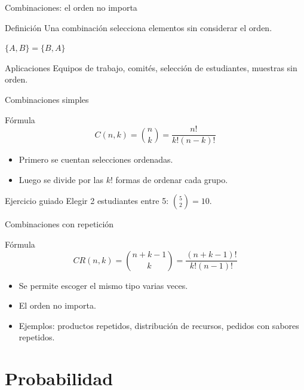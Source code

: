 \documentclass[aspectratio=169,11pt]{beamer}
\begin{document}
\begin{frame}{Combinaciones: el orden no importa}
\begin{block}{Definición}
Una combinación selecciona elementos sin considerar el orden.
\end{block}
\begin{center}
$\{A,B\}=\{B,A\}$
\end{center}
\begin{exampleblock}{Aplicaciones}
Equipos de trabajo, comités, selección de estudiantes, muestras sin orden.
\end{exampleblock}
\end{frame}

\begin{frame}{Combinaciones simples}
\begin{block}{Fórmula}
\[
C(n,k)=\binom{n}{k}=\frac{n!}{k!(n-k)!}
\]
\end{block}
\begin{itemize}
  \item Primero se cuentan selecciones ordenadas.
  \item Luego se divide por las $k!$ formas de ordenar cada grupo.
\end{itemize}
\begin{exampleblock}{Ejercicio guiado}
Elegir 2 estudiantes entre 5: \pause $\binom{5}{2}=10$.
\end{exampleblock}
\end{frame}

\begin{frame}{Combinaciones con repetición}
\begin{block}{Fórmula}
\[
CR(n,k)=\binom{n+k-1}{k}=\frac{(n+k-1)!}{k!(n-1)!}
\]
\end{block}
\begin{itemize}
  \item Se permite escoger el mismo tipo varias veces.
  \item El orden no importa.
  \item Ejemplos: productos repetidos, distribución de recursos, pedidos con sabores repetidos.
\end{itemize}
\end{frame}

\section{Probabilidad}
\end{document}
